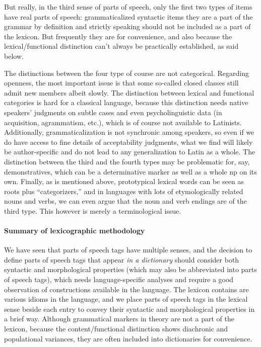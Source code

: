 \documentclass[a4paper, oneside, 12pt]{report}
\begin{document}
But really, in the third sense of parts of speech,
only the first two types of items have real parts of speech:
grammaticalized syntactic items 
they are a part of the grammar by definition
and strictly speaking should not be included as a part of the lexicon.
But frequently they are for convenience,
and also because the lexical/functional distinction can't always be practically established,
as said below.

The distinctions between the four type of course are not categorical.
Regarding openness, 
the most important issue is that some so-called closed classes still admit new members albeit slowly.
The distinction between lexical and functional categories is hard for a classical language,
because this distinction needs native speakers' judgments on subtle cases 
and even psycholinguistic data (in acquisition, agrammatism, etc.),
which is of course not available to Latinists.
Additionally, grammaticalization is not synchronic among speakers,
so even if we do have access to fine details of acceptability judgments, 
what we find will likely be author-specific and do not lead to any generalization to Latin as a whole.
The distinction between the third and the fourth types 
may be problematic for, say, demonstratives, 
which can be a determinative marker as well as a whole \acs{np} on its own.
Finally, as is mentioned above, prototypical lexical words
can be seen as roots plus ``categorizers,''
and in languages with lots of etymologically related nouns and verbs,
we can even argue that the noun and verb endings are of the third type.
This however is merely a terminological issue.

\paragraph*{Summary of lexicographic methodology}
We have seen that parts of speech tags have multiple senses,
and the decision to define parts of speech tags that appear \emph{in a dictionary} 
should consider both syntactic and morphological properties
(which may also be abbreviated into parts of speech tags),
which needs language-specific analyses
and require a good observation of constructions available in the language.
The lexicon contains are various idioms in the language,
and we place parts of speech tags in the lexical sense beside each entry
to convey their syntactic and morphological properties in a brief way.
Although grammatical markers in theory are not a part of the lexicon,
because the content/functional distinction shows 
diachronic and populational variances,
they are often included into dictionaries for convenience.
\end{document}
